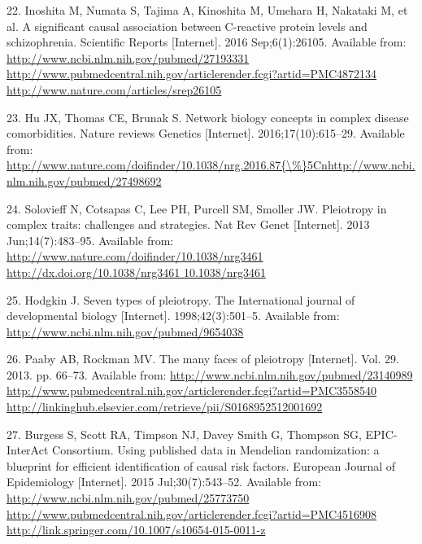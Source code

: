 \documentclass[]{article}
\begin{document}
\hypertarget{ref-Inoshita2016}{}
22. Inoshita M, Numata S, Tajima A, Kinoshita M, Umehara H, Nakataki M,
et al. A significant causal association between C-reactive protein
levels and schizophrenia. Scientific Reports {[}Internet{]}. 2016
Sep;6(1):26105. Available from:
\href{http://www.ncbi.nlm.nih.gov/pubmed/27193331\%20http://www.pubmedcentral.nih.gov/articlerender.fcgi?artid=PMC4872134\%20http://www.nature.com/articles/srep26105}{http://www.ncbi.nlm.nih.gov/pubmed/27193331 http://www.pubmedcentral.nih.gov/articlerender.fcgi?artid=PMC4872134 http://www.nature.com/articles/srep26105}

\hypertarget{ref-Hu2016}{}
23. Hu JX, Thomas CE, Brunak S. Network biology concepts in complex
disease comorbidities. Nature reviews Genetics {[}Internet{]}.
2016;17(10):615--29. Available from:
\href{http://www.nature.com/doifinder/10.1038/nrg.2016.87\%7B/\%\%7D5Cnhttp://www.ncbi.nlm.nih.gov/pubmed/27498692}{http://www.nature.com/doifinder/10.1038/nrg.2016.87\{\textbackslash{}\%\}5Cnhttp://www.ncbi.nlm.nih.gov/pubmed/27498692}

\hypertarget{ref-Solovieff2013}{}
24. Solovieff N, Cotsapas C, Lee PH, Purcell SM, Smoller JW. Pleiotropy
in complex traits: challenges and strategies. Nat Rev Genet
{[}Internet{]}. 2013 Jun;14(7):483--95. Available from:
\href{http://www.nature.com/doifinder/10.1038/nrg3461\%20http://dx.doi.org/10.1038/nrg3461\%2010.1038/nrg3461}{http://www.nature.com/doifinder/10.1038/nrg3461 http://dx.doi.org/10.1038/nrg3461 10.1038/nrg3461}

\hypertarget{ref-Hodgkin1998}{}
25. Hodgkin J. Seven types of pleiotropy. The International journal of
developmental biology {[}Internet{]}. 1998;42(3):501--5. Available from:
\url{http://www.ncbi.nlm.nih.gov/pubmed/9654038}

\hypertarget{ref-Paaby2013}{}
26. Paaby AB, Rockman MV. The many faces of pleiotropy {[}Internet{]}.
Vol. 29. 2013. pp. 66--73. Available from:
\href{http://www.ncbi.nlm.nih.gov/pubmed/23140989\%20http://www.pubmedcentral.nih.gov/articlerender.fcgi?artid=PMC3558540\%20http://linkinghub.elsevier.com/retrieve/pii/S0168952512001692}{http://www.ncbi.nlm.nih.gov/pubmed/23140989 http://www.pubmedcentral.nih.gov/articlerender.fcgi?artid=PMC3558540 http://linkinghub.elsevier.com/retrieve/pii/S0168952512001692}

\hypertarget{ref-Burgess2015b}{}
27. Burgess S, Scott RA, Timpson NJ, Davey Smith G, Thompson SG, EPIC-
InterAct Consortium. Using published data in Mendelian randomization: a
blueprint for efficient identification of causal risk factors. European
Journal of Epidemiology {[}Internet{]}. 2015 Jul;30(7):543--52.
Available from:
\href{http://www.ncbi.nlm.nih.gov/pubmed/25773750\%20http://www.pubmedcentral.nih.gov/articlerender.fcgi?artid=PMC4516908\%20http://link.springer.com/10.1007/s10654-015-0011-z}{http://www.ncbi.nlm.nih.gov/pubmed/25773750 http://www.pubmedcentral.nih.gov/articlerender.fcgi?artid=PMC4516908 http://link.springer.com/10.1007/s10654-015-0011-z}
\end{document}
